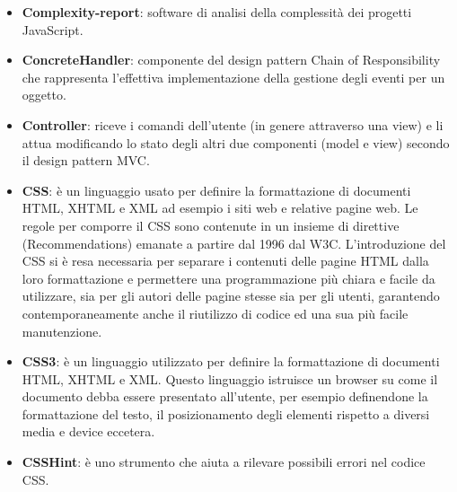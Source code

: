 \begin{itemize}
	\item
	\textbf{Complexity-report}: software di analisi della complessità dei progetti JavaScript.
	\item
	\textbf{ConcreteHandler}:  componente del design pattern Chain of Responsibility che rappresenta l'effettiva implementazione della gestione degli eventi per un oggetto.
	\item
	\textbf{Controller}: riceve i comandi dell'utente (in genere attraverso una view) e li attua modificando lo stato degli altri due componenti (model e view) secondo il design pattern MVC. 
	\item
	\textbf{CSS}: è un linguaggio usato per definire la formattazione di documenti HTML, XHTML e XML ad esempio i siti web e relative pagine web. Le regole per comporre il CSS sono contenute in un insieme di direttive (Recommendations) emanate a partire dal 1996 dal W3C.
	L'introduzione del CSS si è resa necessaria per separare i contenuti delle pagine HTML dalla loro formattazione e permettere una programmazione più chiara e facile da utilizzare, sia per gli autori delle pagine stesse sia per gli utenti, garantendo contemporaneamente anche il riutilizzo di codice ed una sua più facile manutenzione. 
	\item
	\textbf{CSS3}: è un linguaggio utilizzato per definire la formattazione di documenti HTML, XHTML e XML.
	Questo linguaggio istruisce un browser su come il documento debba essere presentato all'utente, per esempio definendone la formattazione del testo, il posizionamento degli elementi rispetto a diversi media e device eccetera.
	\item
	\textbf{CSSHint}: è uno strumento che aiuta a rilevare possibili errori nel codice CSS.
\end{itemize}